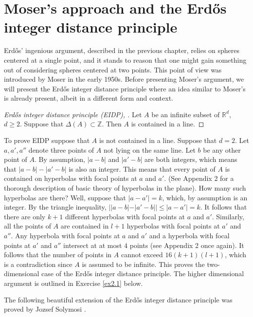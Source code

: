 \documentclass[]{amsart}
\numberwithin{equation}{section}
\theoremstyle{plain}
\theoremstyle{definition}
\theoremstyle{remark}
\begin{document}
\section{Moser's approach and the Erd\H{o}s integer distance
principle}




Erd\H{o}s' ingenious argument, described in the previous chapter,
relies on spheres centered at a single point, and it stands to
reason that one might gain something out of considering spheres
centered at two points. This point of view was introduced by Moser
in the early 1950s. Before presenting Moser's argument, we will
present the Erd\H{o}s integer distance principle where an idea similar
to Moser's is already present, albeit in a different form and
context.

\begin{proof}[Erd\H{o}s integer distance principle (EIDP), \cite{Erd2}] Let $A$ be an
infinite subset of $\mathbb{R}^d$, $d \ge 2$. Suppose that
$\Delta(A) \subset \mathbb{Z}$. Then $A$ is contained in a line.
\end{proof}

To prove EIDP suppose that $A$ is not contained in a line. Suppose
that $d=2$. Let $a,a',a''$ denote three points of $A$ not lying on
the same line. Let $b$ be any other point of $A$. By assumption,
$|a-b|$ and $|a'-b|$ are both integers, which means that
$|a-b|-|a'-b|$ is also an integer. This means that every point of
$A$ is contained on hyperbolas with focal points at $a$ and $a'$.
(See Appendix 2 for a thorough description of basic theory of
hyperbolas in the plane). How many such hyperbolas are there?
Well, suppose that $|a-a'|=k$, which, by assumption is an integer.
By the triangle inequality, $||a-b|-|a'-b|| \leq |a-a'|=k$. It
follows that there are only $k+1$ different hyperbolas with focal
points at $a$ and $a'$. Similarly, all the points of $A$ are
contained in $l+1$ hyperbolas with focal points at $a'$ and $a''$.
Any hyperbola with focal points at $a$ and $a'$ and a hyperbola
with focal points at $a'$ and $a''$ intersect at at most $4$
points (see Appendix 2 once again). It follows that the number of
points in $A$ cannot exceed $16(k+1)(l+1)$, which is a
contradiction since $A$ is assumed to be infinite. This proves the
two-dimensional case of the Erd\H{o}s integer distance principle. The
higher dimensional argument is outlined in Exercise \ref{ex2.1} below.

The following beautiful extension of the Erd\H{o}s integer distance
principle was proved by Jozsef Solymosi \cite{Soly}.
\end{document}
